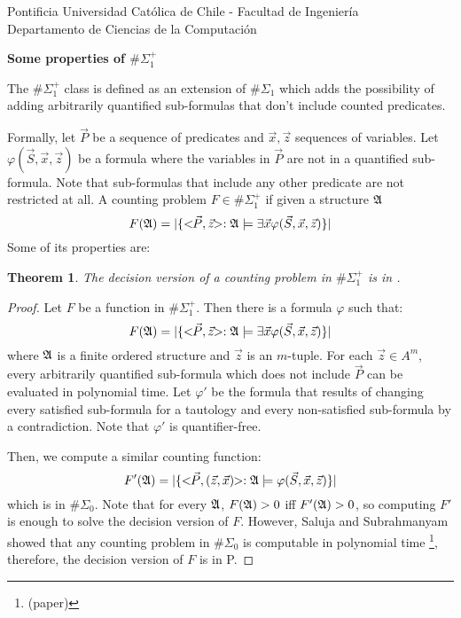 \documentclass[12pt]{article}
\def\A{{\frak A}}
\newtheorem{theo}{Theorem}
\begin{document}
\begin{flushleft}
{\footnotesize Pontificia Universidad Cat\'olica de Chile - Facultad de Ingenier\'ia\\
Departamento de Ciencias de la Computaci\'on\\
}
\end{flushleft}
\begin{center}
{ \LARGE \bf
  Some properties of $\#\Sigma_1^{+}$
}
\end{center}

The $\#\Sigma_1^{+}$ class is defined as an extension of $\#\Sigma_1$ which adds the possibility of adding arbitrarily quantified sub-formulas that don't include counted predicates.

Formally, let $\vec{P}$ be a sequence of predicates and $\vec{x},\vec{z}$ sequences of variables. Let $\varphi(\vec{S},\vec{x},\vec{z})$ be a formula where the variables in $\vec{P}$ are not in a quantified sub-formula. Note that sub-formulas that include any other predicate are not restricted at all. A counting problem $F \in \#\Sigma_1^{+}$ if given a structure $\A$
$$
F(\A) = \vert \{ <\!\!\vec{P},\vec{z}\!\!> :\A \models \exists \vec{x} \varphi(\vec{S},\vec{x},\vec{z}) \} \vert
$$ 
Some of its properties are:

\begin{theo}
The decision version of a counting problem in $\#\Sigma_1^{+}$ is in .
\end{theo}
\begin{proof}
Let $F$ be a function in $\#\Sigma_1^{+}$. Then there is a formula $\varphi$ such that:
$$
F(\A) = \vert \{ <\!\!\vec{P},\vec{z}\!\!> :\A \models \exists \vec{x} \varphi(\vec{S},\vec{x},\vec{z}) \} \vert
$$ 
where $\A$ is a finite ordered structure and $\vec{z}$ is an $m$-tuple. For each $\vec{z} \in A^m$, every arbitrarily quantified sub-formula which does not include $\vec{P}$ can be evaluated in polynomial time. Let $\varphi'$ be the formula that results of changing every satisfied sub-formula for a tautology and every non-satisfied sub-formula by a contradiction. Note that $\varphi'$ is quantifier-free.

Then, we compute a similar counting function:
$$
F'(\A) = \vert \{ <\!\!\vec{P},(\vec{z},\vec{x})\!\!> :\A \models \varphi(\vec{S},\vec{x},\vec{z}) \} \vert
$$ 
which is in $\#\Sigma_0$. Note that for every $\A$, $F(\A) > 0$ iff $F'(\A) > 0$, so computing $F'$ is enough to solve the decision version of $F$. However, Saluja and Subrahmanyam showed that any counting problem in $\#\Sigma_0$ is computable in polynomial time \footnote[1]{(paper)}, therefore, the decision version of $F$ is in P.
\end{proof}
\end{document}
